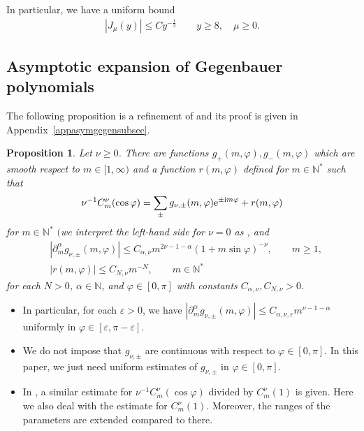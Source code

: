 \documentclass[pdftex]{sigma}
\numberwithin{equation}{section}
\newtheorem{Proposition}[Theorem]{Proposition}
 { \theoremstyle{definition}
\newtheorem{Definition}[Theorem]{Definition}
\newtheorem{Note}[Theorem]{Note}
\newtheorem{Example}[Theorem]{Example}
\newtheorem{Remark}[Theorem]{Remark} }
\def\a{\alpha}
\def\e{\varepsilon}
\def\f{\varphi}
\def\m{\mu}
\def\n{\nu}
\def\pa{\partial}
\begin{document}
In particular, we have a uniform bound
\begin{align}\label{Besselunif}
|J_{\m}(y)|\leq Cy^{-\frac{1}{3}}\qquad y\geq 8,\quad \m\geq 0.
\end{align}

\subsection{Asymptotic expansion of Gegenbauer polynomials}

The following proposition is a refinement of \cite[Lemma 10.2]{IJ} and its proof is given in Appendix~\ref{appasymgegensubsec}.

\begin{Proposition}\label{Gegenasymp}
Let $\n\geq 0$.
There are functions $g_{+}(m,\f), g_{-}(m,\f)$ which are smooth respect to $m\in [1,\infty)$ and a function $r(m,\f)$ defined for $m\in\mathbb{N}^*$ such that
\begin{align*}
\n^{-1}C_m^{\n}(\cos\f)=\sum_{\pm}g_{\n,\pm}(m,\f){\rm e}^{\pm {\rm i}m\f}+r(m,\f)
\end{align*}
for $m\in \mathbb{N}^*$ $($we interpret the left-hand side for $\n=0$ as \smash{$\lim_{\n\searrow 0}\n^{-1}C_m^{\n}(\cos \f))$}, and
\begin{align*}
&|\pa_m^{\a}g_{\n,\pm}(m,\f)|\leq
C_{\a,\n}m^{2\n-1-\a}(1+m\sin\f)^{-\n},\qquad m\geq 1,\\
&|r(m,\f)|\leq C_{N,\n}m^{-N},\qquad m\in\mathbb{N}^*
\end{align*}
for each $N>0$, $\a\in\mathbb{N}$, and $\f\in [0,\pi]$ with constants $C_{\a,\n}, C_{N,\n}>0$.
\end{Proposition}

\begin{Remark}\quad
\begin{itemize}\itemsep=0pt
\item[(1)] In particular, for each $\e>0$, we have $|\pa_m^{\a}g_{\n,\pm}(m,\f)|\leq C_{\a,\n,\e}m^{\n-1-\a}$ uniformly in $\f\in [\e,\pi-\e]$.
\item[(2)] We do not impose that $g_{\n,\pm}$ are continuous with respect to $\f\in [0,\pi]$. In this paper, we just need uniform estimates of $g_{\n,\pm}$ in $\f\in [0,\pi]$.
\item[(3)]
In \cite[Lemma 10.2]{IJ}, a similar estimate for $\n^{-1}C_m^{\n}(\cos\f)$ divided by $C_m^{\n}(1)$ is given.
Here we also deal with the estimate for $C_m^{\n}(1)$.
Moreover, the ranges of the parameters are extended compared to there.
\end{itemize}
\end{Remark}
\end{document}
